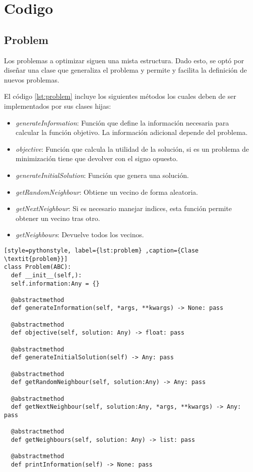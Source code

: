 \chapter{Codigo}

\section{Problem}

Los problemas a optimizar siguen una mista estructura. Dado esto, se optó por diseñar una clase que generaliza el problema y permite y facilita la definición de nuevos problemas.

El código \ref{lst:problem} incluye los siguientes métodos los cuales deben de ser implementados por sus clases hijas:
\begin{itemize}
	\item \textit{generateInformation}: Función que define la información necesaria para calcular la función objetivo. La información adicional depende del problema.
	\item \textit{objective}: Función que calcula la utilidad de la solución, si es un problema de minimización tiene que devolver con el signo opuesto. 
	\item \textit{generateInitialSolution}: Función que genera una solución.
	\item \textit{getRandomNeighbour}: Obtiene un vecino de forma aleatoria.
	\item \textit{getNextNeighbour}: Si es necesario manejar indices, esta función permite obtener un vecino tras otro.
	\item \textit{getNeighbours}: Devuelve todos los vecinos.
\end{itemize}

\begin{lstlisting}[style=pythonstyle, label={lst:problem} ,caption={Clase \textit{problem}}]
class Problem(ABC):
  def __init__(self,):
  self.information:Any = {}

  @abstractmethod
  def generateInformation(self, *args, **kwargs) -> None: pass

  @abstractmethod
  def objective(self, solution: Any) -> float: pass

  @abstractmethod
  def generateInitialSolution(self) -> Any: pass

  @abstractmethod
  def getRandomNeighbour(self, solution:Any) -> Any: pass

  @abstractmethod
  def getNextNeighbour(self, solution:Any, *args, **kwargs) -> Any: pass

  @abstractmethod
  def getNeighbours(self, solution: Any) -> list: pass

  @abstractmethod
  def printInformation(self) -> None: pass
\end{lstlisting}

